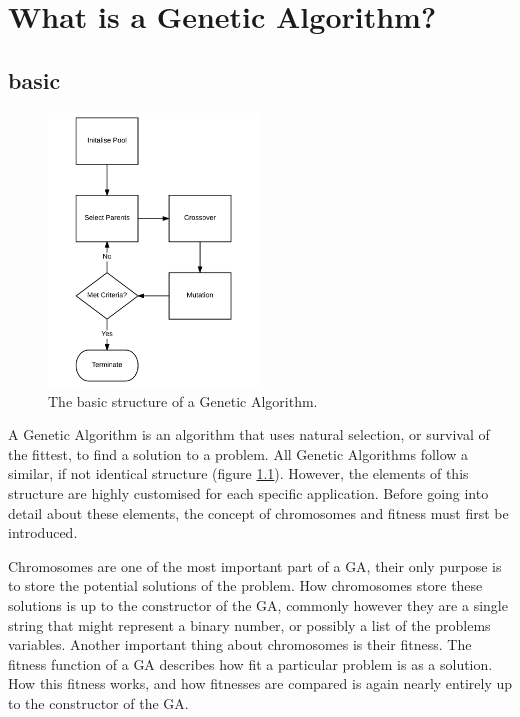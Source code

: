 \chapter{What is a Genetic Algorithm?}
\section{basic}
\par
\begin{figure}[h]
	\centering
		\includegraphics[width=0.5\textwidth]{GA_Structure}
	\caption{The basic structure of a Genetic Algorithm.}
	\label{struct}
\end{figure}
\noindent
A Genetic Algorithm is an algorithm that uses natural selection, or survival of the fittest, to find a solution to a problem. All Genetic Algorithms follow a similar, if not identical structure (figure \ref{struct}). However, the elements of this structure are highly customised for each specific application. Before going into detail about these elements, the concept of chromosomes and fitness must first be introduced.
\par
Chromosomes are one of the most important part of a GA, their only purpose is to store the potential solutions of the problem. How chromosomes store these solutions is up to the constructor of the GA, commonly however they are a single string that might represent a binary number, or possibly a list of the problems variables. Another important thing about chromosomes is their fitness. The fitness function of a GA describes how fit a particular problem is as a solution. How this fitness works, and how fitnesses are compared is again nearly entirely up to the constructor of the GA.



